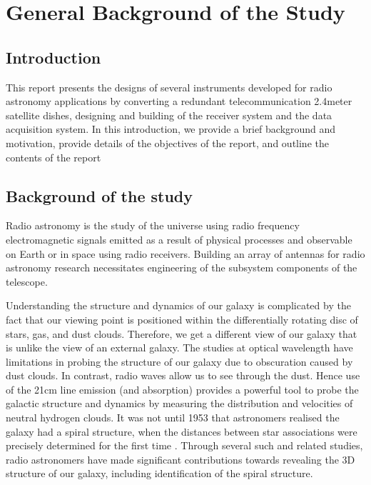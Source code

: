 
\chapter{General Background of the Study}
\label{chapter 1}
\large{
\section{Introduction}
This report presents the designs of several instruments developed for radio astronomy applications by converting a redundant telecommunication 2.4meter satellite dishes, designing and building of the receiver system and  the data acquisition system.
 In this introduction, we provide a brief background and motivation, provide details of the objectives of the report, and outline the contents of the report



\section{Background of the study}

Radio astronomy is the study of the universe using radio frequency electromagnetic signals emitted as a result of physical processes and observable on Earth or in space using radio receivers.
Building an array of antennas for radio astronomy research necessitates engineering of the subsystem components of the telescope.


Understanding the structure and dynamics of our galaxy is complicated by the fact that our viewing point is positioned within the differentially rotating disc of stars, gas, and dust clouds. Therefore, we get a different view of our galaxy that is unlike the view of an external galaxy. The studies at optical wavelength have limitations in probing the structure of our galaxy due to obscuration caused by dust clouds. 
In contrast, radio waves allow us to see through the dust. Hence use of the 21cm line emission (and absorption) provides a powerful tool to probe the galactic structure and dynamics  by measuring the distribution and velocities of neutral hydrogen clouds. It was not until 1953 that astronomers realised the galaxy had a spiral structure, when the distances between star associations were precisely determined for the first time \cite{unsold2002structure}. 
Through several such and related studies, radio astronomers have made significant contributions towards revealing the 3D structure of our galaxy, including identification of the spiral structure.


}
